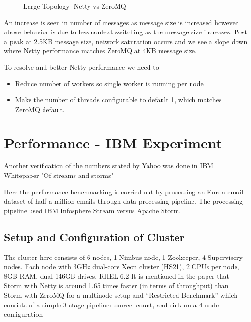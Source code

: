 \documentclass[9pt,twocolumn,twoside]{styles/osajnl}
\begin{document}
\begin{figure}[htbp]
	\centering
	\caption{Large Topology- Netty vs ZeroMQ
          \cite{article-storm-netty}}
	\label{fig:NettyVsZMQFull}
\end{figure}

An increase is seen in number of messages as message size is increased
however above behavior is due to less context switching as the message
size increases. Post a peak at 2.5KB message size, network saturation
occurs and we see a slope down where Netty performance matches ZeroMQ
at 4KB message size.

To resolve and better Netty performance we need to-
\begin{itemize}
	\renewcommand{\labelitemi}{\scriptsize$\square$} 
	\item Reduce number of workers so single worker is running per
          node
        \item Make the number of threads configurable to default 1,
          which matches ZeroMQ default.
\end{itemize}

\section{Performance - IBM Experiment}
Another verification of the numbers stated by Yahoo was done in IBM
Whitepaper "Of streams and storms" \cite{article-nabi2014streams}

Here the performance benchmarking is carried out by processing an
Enron email dataset of half a million emails through data processing
pipeline. The processing pipeline used IBM Infosphere Stream versus
Apache Storm.

\subsection{Setup and Configuration of Cluster}
The cluster here consists of 6-nodes, 1 Nimbus node, 1 Zookeeper, 4
Supervisory nodes. Each node with 3GHz dual-core Xeon cluster (HS21),
2 CPUs per node, 8GB RAM, dual 146GB drives, RHEL 6.2 It is mentioned
in the paper that Storm with Netty is around 1.65 times faster (in
terms of throughput) than Storm with ZeroMQ for a multinode setup and
“Restricted Benchmark” which consists of a simple 3-stage pipeline:
source, count, and sink on a 4-node configuration
\end{document}
